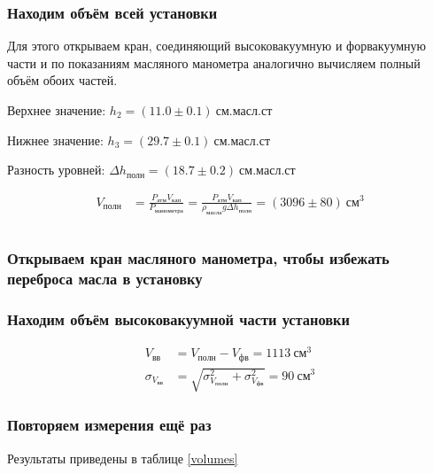 \documentclass[a4paper, 12pt]{article}
\begin{document}
        \subsubsection{Находим объём всей установки}

            Для этого открываем кран, соединяющий высоковакуумную и форвакуумную части и по показаниям масляного манометра аналогично вычисляем полный объём обоих частей.

            Верхнее значение: $h_2 = (11.0 \pm 0.1)~см.масл.ст$

            Нижнее значение:  $h_3 = (29.7 \pm 0.1)~см.масл.ст$

            Разность уровней: $\Delta h_{полн} = (18.7 \pm 0.2)~см.масл.ст$

            \begin{align*}
                V_{полн} &= \frac{P_{атм} V_{кап}}{P_{манометра}} = \frac{P_{атм} V_{кап}}{\rho_{масла} g \Delta h_{полн}} = (3096 \pm 80)~см^3\\\\
            \end{align*}

        \subsubsection{Открываем кран масляного манометра, чтобы избежать переброса масла в установку}

        \subsubsection{Находим объём высоковакуумной части установки}

            \begin{align}
                V_{вв} &= V_{полн} - V_{фв} = 1113~см^3\\
                \sigma_{V_{вв}} &= \sqrt{ \sigma_{V_{полн}}^2 + \sigma_{V_{фв}}^2 } = 90~см^3
            \end{align}

    \subsubsection{Повторяем измерения ещё раз}

        Результаты приведены в таблице \ref{volumes}
\end{document}
